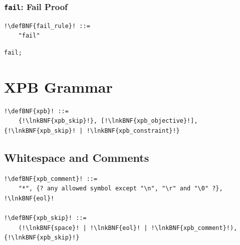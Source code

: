 \documentclass[a4paper]{article}
\newcommand{\defBNF}[1]{\hypertarget{def:#1}{<\detokenize{#1}>}}
\newcommand{\lnkBNF}[1]{\hyperlink{def:#1}{<\detokenize{#1}>}}
\begin{document}
\subsubsection{\texttt{fail}: Fail Proof}\label{sec:rules-fail}
\begin{lstlisting}
!\defBNF{fail_rule}! ::=
	"fail"
\end{lstlisting}
\begin{lstlisting}[language=veripb]
fail;
\end{lstlisting}


\section{XPB Grammar}\label{sec:grammar-opb}
\begin{lstlisting}
!\defBNF{xpb}! ::=
	{!\lnkBNF{xpb_skip}!}, [!\lnkBNF{xpb_objective}!], {!\lnkBNF{xpb_skip}! | !\lnkBNF{xpb_constraint}!}
\end{lstlisting}


\subsection{Whitespace and Comments}
\begin{lstlisting}
!\defBNF{xpb_comment}! ::=
	"*", {? any allowed symbol except "\n", "\r" and "\0" ?}, !\lnkBNF{eol}!

!\defBNF{xpb_skip}! ::=
	(!\lnkBNF{space}! | !\lnkBNF{eol}! | !\lnkBNF{xpb_comment}!), {!\lnkBNF{xpb_skip}!}
\end{lstlisting}
\end{document}
